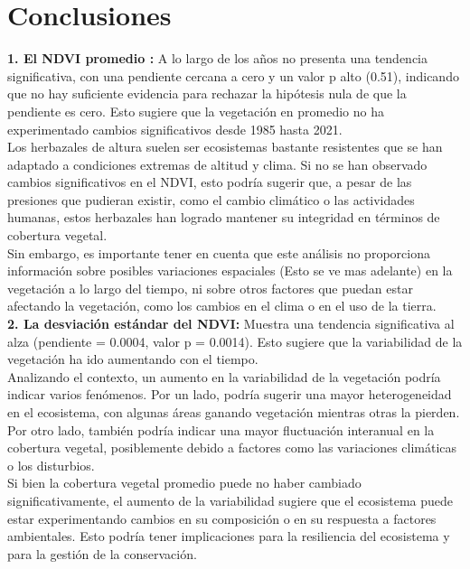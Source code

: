 \maketitle
\section{Conclusiones}
{\small
\textbf{1.	El NDVI promedio :} A lo largo de los años no presenta una tendencia significativa, con una pendiente cercana a cero y un valor p alto (0.51), indicando que no hay suficiente evidencia para rechazar la hipótesis nula de que la pendiente es cero. Esto sugiere que la vegetación en promedio no ha experimentado cambios significativos desde 1985 hasta 2021.\\

Los herbazales de altura suelen ser ecosistemas bastante resistentes que se han adaptado a condiciones extremas de altitud y clima. Si no se han observado cambios significativos en el NDVI, esto podría sugerir que, a pesar de las presiones que pudieran existir, como el cambio climático o las actividades humanas, estos herbazales han logrado mantener su integridad en términos de cobertura vegetal.\\

Sin embargo, es importante tener en cuenta que este análisis no proporciona información sobre posibles variaciones espaciales (Esto se ve mas adelante) en la vegetación a lo largo del tiempo, ni sobre otros factores que puedan estar afectando la vegetación, como los cambios en el clima o en el uso de la tierra. \\




\textbf{2. La desviación estándar del NDVI:}  Muestra una tendencia significativa al alza (pendiente = 0.0004, valor p = 0.0014). Esto sugiere que la variabilidad de la vegetación ha ido aumentando con el tiempo.\\

Analizando el contexto, un aumento en la variabilidad de la vegetación podría indicar varios fenómenos. Por un lado, podría sugerir una mayor heterogeneidad en el ecosistema, con algunas áreas ganando vegetación mientras otras la pierden. Por otro lado, también podría indicar una mayor fluctuación interanual en la cobertura vegetal, posiblemente debido a factores como las variaciones climáticas o los disturbios.\\

Si bien la cobertura vegetal promedio puede no haber cambiado significativamente, el aumento de la variabilidad sugiere que el ecosistema puede estar experimentando cambios en su composición o en su respuesta a factores ambientales. Esto podría tener implicaciones para la resiliencia del ecosistema y para la gestión de la conservación.\\


}
